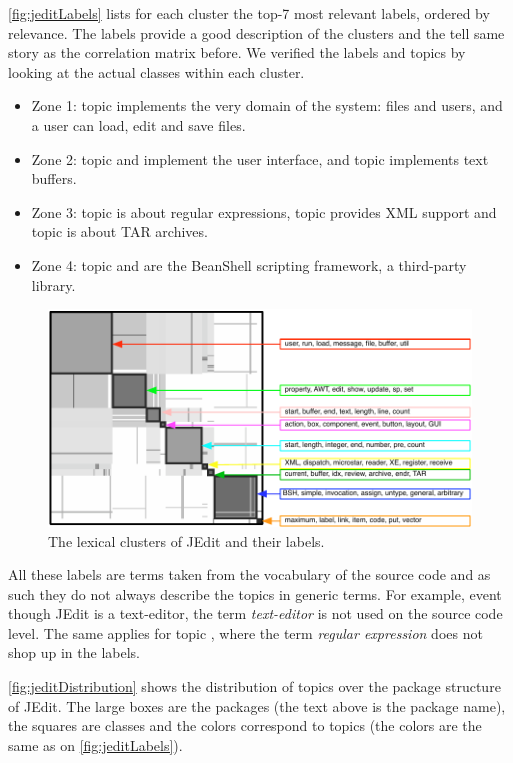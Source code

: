 \autoref{fig:jeditLabels} lists for each cluster the top-7 most relevant labels, ordered by relevance. The labels provide a good description of the clusters and the tell same story as the correlation matrix before. We verified the labels and topics by looking at the actual classes within each cluster.

\begin{itemize}
  \item Zone 1: topic \red implements the very domain of the system: files and users, and a user can load, edit and save files.
  \item Zone 2: topic \green and \magenta implement the user interface, and topic \pink implements text buffers.
  \item Zone 3: topic \cyan is about regular expressions, topic \yellow provides XML support and topic \darkgreen is about TAR archives.
  \item Zone 4: topic \blue and \orange are the BeanShell scripting framework, a third-party library.
\end{itemize}

\begin{figure}[h]
\centering
\includegraphics[width=\columnwidth]{fig/hapax-jedit-correlation-labels}
\caption{The lexical clusters of JEdit and their labels.}\label{fig:jeditLabels}
\end{figure}

All these labels are terms taken from the vocabulary of the source code and as such they do not always describe the topics in generic terms. For example, event though JEdit is a text-editor, the term \emph{text-editor} is not used on the source code level. The same applies for topic \cyan, where the term \emph{regular expression} does not shop up in the labels.

\autoref{fig:jeditDistribution} shows the distribution of topics over the package structure of JEdit. The large boxes are the packages (the text above is the package name), the squares are classes and the colors correspond to topics (the colors are the same as on \autoref{fig:jeditLabels}).

